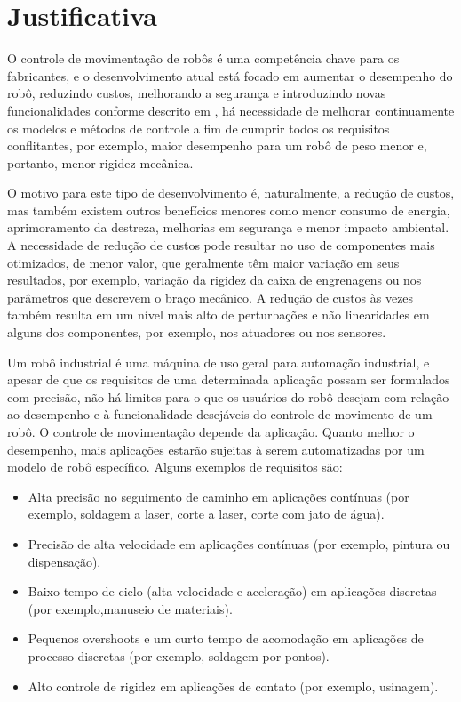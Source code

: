  

\section{Justificativa}

O controle de movimentação de robôs é uma competência chave para os fabricantes, e o desenvolvimento atual está focado em aumentar o desempenho do robô, reduzindo custos, melhorando a segurança e introduzindo novas funcionalidades conforme descrito
em \cite{brogaardh2007present}, há necessidade de melhorar continuamente os modelos e métodos 
de controle a fim de cumprir todos os requisitos conflitantes, por exemplo,
maior desempenho para um robô de peso menor e, portanto, menor rigidez mecânica.

O motivo para este tipo de desenvolvimento é, naturalmente, a redução de custos, mas também existem outros benefícios menores como menor consumo de energia, aprimoramento da destreza, melhorias em segurança
e menor impacto ambiental. A necessidade de redução de custos pode resultar no uso
de componentes mais otimizados, de menor valor, que geralmente têm maior variação em seus resultados,
por exemplo, variação da rigidez da caixa de engrenagens ou nos parâmetros que descrevem o
braço mecânico. A redução de custos às vezes também resulta em um nível mais alto de perturbações e
não linearidades em alguns dos componentes, por exemplo, nos atuadores ou nos sensores.

Um robô industrial é uma máquina de uso geral para automação industrial, e apesar de que os requisitos de uma determinada aplicação possam ser formulados com precisão, não há limites para o que os usuários do robô desejam com relação ao desempenho e à funcionalidade desejáveis do controle de movimento de um robô. O controle de movimentação depende da aplicação. Quanto melhor o desempenho,
mais aplicações estarão sujeitas à serem automatizadas por um modelo de robô específico.
Alguns exemplos de requisitos são:

\begin{itemize}
   \item Alta precisão no seguimento de caminho em aplicações contínuas (por exemplo, soldagem a laser, corte a laser, corte com jato de água).
   \item Precisão de alta velocidade em aplicações contínuas (por exemplo, pintura ou dispensação).
   \item Baixo tempo de ciclo (alta velocidade e aceleração) em aplicações discretas (por exemplo,manuseio de materiais).
   \item Pequenos overshoots e um curto tempo de acomodação em aplicações de processo discretas
(por exemplo, soldagem por pontos).
   \item Alto controle de rigidez em aplicações de contato (por exemplo, usinagem).
 \end{itemize}


